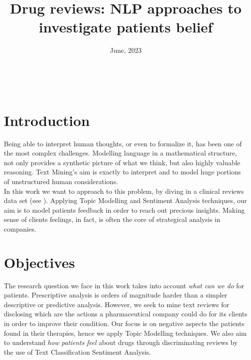 \documentclass[10pt, a4paper, twocolumn]{article}
\title{Drug reviews: NLP approaches to investigate patients belief}
\author{
	\authorstyle{Greta Gravina and Niccolò Rocchi}
	\newline\newline
	\institution{Università degli Studi di Milano-Bicocca, Milan, Italy}
}
\date{June, 2023}
\begin{document}
    \maketitle
    \thispagestyle{firstpage} %


    \\
    
    
    \section{Introduction}
        Being able to interpret human thoughts, or even to formalize it, has been one of the most complex challenges. Modelling language in a mathematical structure, not only provides a synthetic picture of what we think, but also highly valuable reasoning. 
        Text Mining's aim is exactly to interpret and to model huge portions 
        of unstructured human considerations.\\
        In this work we want to approach to this problem, by diving in a clinical reviews data set (see \cite{Graber}). Applying Topic Modelling and Sentiment Analysis techniques, our aim is to model patients feedback in order to reach out precious insights. Making sense of clients feelings, in fact, is often the core of strategical analysis in companies.  

    \section{Objectives}
        The research question we face in this work takes into account \emph{what can we do} for patients. Prescriptive analysis is orders of magnitude harder than a simpler descriptive or predictive analysis. However, we seek to mine text reviews for disclosing which are the actions a pharmaceutical company could do for its clients in order to improve their condition. Our focus is on negative aspects the patients found in their therapies, hence we apply Topic Modelling techniques. We also aim to understand \emph{how patients feel} about drugs through discriminating reviews by the use of Text Classification Sentiment Analysis.
        
\end{document}
